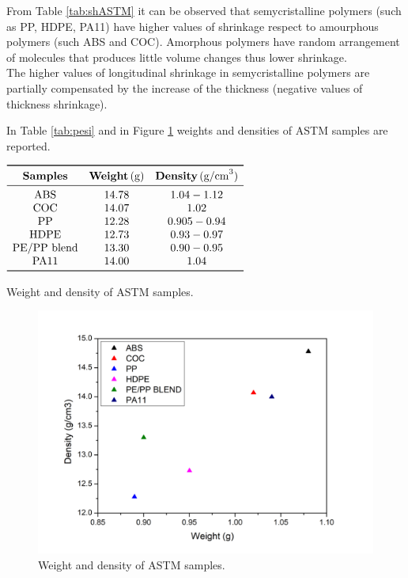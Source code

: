 \documentclass[a4paper, 11pt]{article}
\begin{document}
From Table \ref{tab:shASTM} it can be observed that semycristalline polymers (such as PP, HDPE, PA11) have higher values of shrinkage respect to amourphous polymers (such ABS and COC). Amorphous polymers have random arrangement of molecules that produces little volume changes thus lower shrinkage. \\
The higher values of longitudinal shrinkage in semycristalline polymers are partially compensated by the increase of the thickness (negative values of thickness shrinkage).

In Table \ref{tab:pesi} and in Figure \ref{fig:wd} weights and densities of ASTM samples are reported.

\begin{table}[htp]
\centering
$
\begin{array}{ccc}
\toprule
\textbf{Samples} & \textbf{Weight}\,(\text{g}) & \textbf{Density}\,(\text{g/cm}^3) \\
\midrule
\text{ABS} & 14.78 & 1.04-1.12  \\
\text{COC} & 14.07 & 1.02 \\
\text{PP} & 12.28 & 0.905-0.94 \\
\text{HDPE} & 12.73 & 0.93-0.97 \\
\text{PE/PP blend} & 13.30 & 0.90-0.95 \\
\text{PA11} & 14.00 & 1.04 \\
\bottomrule
\end{array}
$
\caption{Weight and density of ASTM samples.}
\label{tab:pesi}
\end{table}

\begin{figure}[htp]
	\centering
	\includegraphics[scale=0.3]{Graph1}
	\caption{Weight and density of ASTM samples.}
	\label{fig:wd}
\end{figure}
\end{document}
